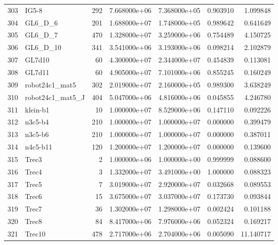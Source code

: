 \begin{tabular}{llrrrrr}
303 &                    IG5-8 &   292 &  7.668000e+06 &  7.368000e+05 &  0.903910 &   1.099848 \\
304 &                  GL6\_D\_6 &   201 &  1.688000e+07 &  1.748000e+05 &  0.989642 &   0.641649 \\
305 &                  GL6\_D\_7 &   470 &  1.328000e+07 &  3.259000e+06 &  0.754489 &   4.150725 \\
306 &                 GL6\_D\_10 &   341 &  3.541000e+06 &  3.193000e+06 &  0.098214 &   2.102879 \\
307 &                   GL7d10 &    60 &  4.300000e+07 &  2.344000e+07 &  0.454839 &   0.113081 \\
308 &                   GL7d11 &    60 &  4.905000e+07 &  7.101000e+06 &  0.855245 &   0.160249 \\
309 &           robot24c1\_mat5 &   302 &  2.019000e+07 &  2.160000e+05 &  0.989300 &   3.638249 \\
310 &         robot24c1\_mat5\_J &   404 &  5.047000e+06 &  4.816000e+06 &  0.045855 &   4.246780 \\
311 &                 klein-b1 &    10 &  1.000000e+07 &  8.529000e+06 &  0.147110 &   0.092226 \\
312 &                  n3c5-b4 &   210 &  1.000000e+07 &  1.000000e+07 &  0.000000 &   0.399479 \\
313 &                  n3c5-b6 &   210 &  1.000000e+07 &  1.000000e+07 &  0.000000 &   0.387011 \\
314 &                 n4c5-b11 &   120 &  1.200000e+07 &  1.200000e+07 &  0.000000 &   0.139600 \\
315 &                    Trec3 &     2 &  1.000000e+06 &  1.000000e+00 &  0.999999 &   0.088600 \\
316 &                    Trec4 &     3 &  1.332000e+07 &  3.491000e+00 &  1.000000 &   0.088323 \\
317 &                    Trec5 &     7 &  3.019000e+07 &  2.920000e+07 &  0.032668 &   0.089553 \\
318 &                    Trec6 &    15 &  3.675000e+07 &  3.037000e+07 &  0.173730 &   0.093844 \\
319 &                    Trec7 &    36 &  1.302000e+07 &  1.298000e+07 &  0.002424 &   0.101188 \\
320 &                    Trec8 &    84 &  8.417000e+06 &  7.976000e+06 &  0.052324 &   0.169217 \\
321 &                   Trec10 &   478 &  2.717000e+06 &  2.704000e+06 &  0.005090 &  11.140717 \\

\end{tabular}
